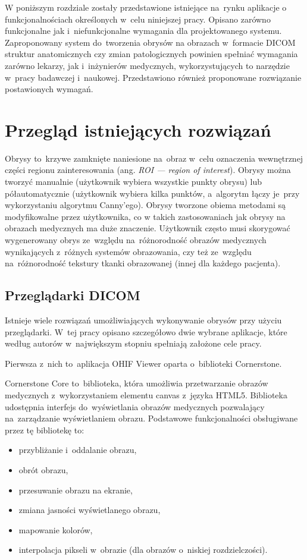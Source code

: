 \documentclass[a4paper,11pt,twoside,openright]{report}
\theoremstyle{definition}
\begin{document}
W poniższym rozdziale zostały przedstawione istniejące na~rynku aplikacje o
funkcjonalnościach określonych w~celu niniejszej pracy. Opisano zarówno funkcjonalne jak i~niefunkcjonalne
wymagania dla projektowanego systemu. Zaproponowany system do~tworzenia obrysów
na obrazach w~formacie DICOM struktur anatomicznych czy zmian patologicznych
powinien spełniać wymagania zarówno lekarzy, jak i~inżynierów medycznych, wykorzystujących
to narzędzie w~pracy badawczej i~naukowej. Przedstawiono również proponowane rozwiązanie
postawionych wymagań.

\section {Przegląd istniejących rozwiązań}

Obrysy to~krzywe zamknięte naniesione na~obraz w~celu oznaczenia wewnętrznej części
regionu zainteresowania (ang. \textit{ROI --- region of interest}).
Obrysy można tworzyć manualnie (użytkownik wybiera wszystkie punkty obrysu) lub
półautomatycznie (użytkownik wybiera kilka punktów, a~algorytm łączy je~przy wykorzystaniu
algorytmu Canny'ego). Obrysy tworzone obiema metodami są modyfikowalne przez użytkownika,
co w takich zastosowaniach jak obrysy na obrazach medycznych ma duże znaczenie. Użytkownik często musi skorygować
wygenerowany obrys ze~względu na~różnorodność obrazów medycznych wynikających z~różnych systemów
obrazowania, czy też ze~względu na~różnorodność tekstury tkanki obrazowanej (innej dla każdego pacjenta).

\subsection {Przeglądarki DICOM}

Istnieje wiele rozwiązań umożliwiających wykonywanie obrysów przy użyciu przeglądarki.
W~tej pracy opisano szczegółowo dwie wybrane aplikacje, które według autorów w~największym
stopniu spełniają założone cele pracy.

Pierwsza z~nich to~aplikacja OHIF Viewer \cite{OHIF Viewer} oparta o~biblioteki Cornerstone.

Cornerstone Core \cite{Cornerstone Core} to~biblioteka, która umożliwia przetwarzanie
obrazów medycznych z~wykorzystaniem elementu canvas z~języka HTML5. Biblioteka
udostępnia interfejs do~wyświetlania obrazów medycznych pozwalający na~zarządzanie
wyświetlaniem obrazu. Podstawowe funkcjonalności obsługiwane przez tę bibliotekę to:

\begin{itemize}[noitemsep]
\item przybliżanie i~oddalanie obrazu,
\item obrót obrazu,
\item przesuwanie obrazu na ekranie,
\item zmiana jasności wyświetlanego obrazu,
\item mapowanie kolorów,
\item interpolacja pikseli w~obrazie (dla obrazów o~niskiej rozdzielczości).
\end{itemize}
\end{document}
